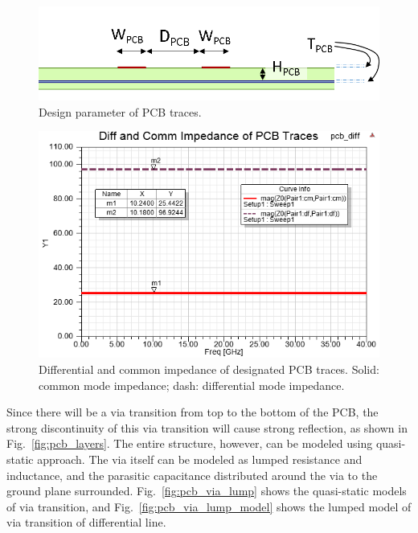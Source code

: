 \documentclass{book}  %
\renewcommand{\subsection}[1]{\psubsection{#1}}
\begin{document}
\begin{paper}
\begin{figure}[htbp!]
	\centering
	\includegraphics[width=0.8\columnwidth]{./img/PCB/differential_PCB_2D_CrossSection.png}
	\caption{Design parameter of PCB traces.}
	\label{fig:pcb_trace} %
\end{figure}

\begin{figure}[htbp!]
	\centering
	\includegraphics[width=0.8\columnwidth]{./img/PCB/differential_PCB_2D_impedance.png}
	\caption{Differential and common impedance of designated PCB traces. Solid: common mode impedance; dash: differential mode impedance.}
	\label{fig:pcb_trace_impedance} %
\end{figure}


\subsection{Via Transition}
\label{subsec:via_tran}
Since there will be a via transition from top to the bottom of the PCB, the strong discontinuity of this via transition will cause strong reflection, as shown in Fig.~\ref{fig:pcb_layers}. The entire structure, however, can be modeled using quasi-static approach. The via itself can be modeled as lumped resistance and inductance, and the parasitic capacitance distributed around the via to the ground plane surrounded. Fig.~\ref{fig:pcb_via_lump} shows the quasi-static models of via transition, and Fig.~\ref{fig:pcb_via_lump_model} shows the lumped model of via transition of differential line. \\


\end{paper}
\end{document}
